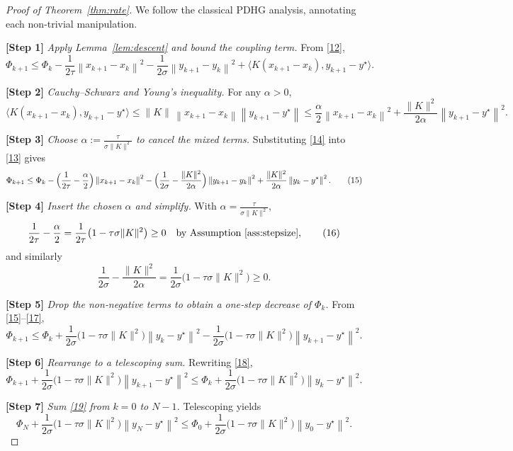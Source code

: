 \documentclass{article}
\newcommand{\ip}[2]{\langle #1,#2\rangle}
\newcommand{\norm}[1]{\left\|#1\right\|}
\begin{document}
\begin{proof}[Proof of Theorem~\ref{thm:rate}]
We follow the classical PDHG analysis, annotating each non‑trivial manipulation.

\medskip
\noindent\textbf{[Step 1]}  \textit{Apply Lemma~\ref{lem:descent} and bound the coupling term.}  
From \eqref{12},
\[
\Phi_{k+1}\le\Phi_{k}
        -\frac{1}{2\tau}\norm{x_{k+1}-x_{k}}^{2}
        -\frac{1}{2\sigma}\norm{y_{k+1}-y_{k}}^{2}
        +\ip{K(x_{k+1}-x_{k})}{y_{k+1}-y^{\star}}.
\tag{13}
\]

\noindent\textbf{[Step 2]}  \textit{Cauchy–Schwarz and Young’s inequality.}  
For any $\alpha>0$,
\[
\ip{K(x_{k+1}-x_{k})}{y_{k+1}-y^{\star}}
\le \|K\|\,\norm{x_{k+1}-x_{k}}\norm{y_{k+1}-y^{\star}}
\le \frac{\alpha}{2}\norm{x_{k+1}-x_{k}}^{2}
   +\frac{\|K\|^{2}}{2\alpha}\norm{y_{k+1}-y^{\star}}^{2}.
\tag{14}
\]

\noindent\textbf{[Step 3]}  \textit{Choose $\alpha:=\frac{\tau}{\sigma\|K\|^{2}}$ to cancel the mixed terms.}  
Substituting \eqref{14} into \eqref{13} gives
\[
\Phi_{k+1}\le\Phi_{k}
        -\Bigl(\frac{1}{2\tau}-\frac{\alpha}{2}\Bigr)\norm{x_{k+1}-x_{k}}^{2}
        -\Bigl(\frac{1}{2\sigma}-\frac{\|K\|^{2}}{2\alpha}\Bigr)\norm{y_{k+1}-y_{k}}^{2}
        +\frac{\|K\|^{2}}{2\alpha}\norm{y_{k}-y^{\star}}^{2}.
\tag{15}
\]

\noindent\textbf{[Step 4]}  \textit{Insert the chosen $\alpha$ and simplify.}  
With $\alpha=\frac{\tau}{\sigma\|K\|^{2}}$,
\[
\frac{1}{2\tau}-\frac{\alpha}{2}
   =\frac{1}{2\tau}\bigl(1-\tau\sigma\|K\|^{2}\bigr)\ge0
\quad\text{by Assumption \ref{ass:stepsize}},
\tag{16}
\]
and similarly
\[
\frac{1}{2\sigma}-\frac{\|K\|^{2}}{2\alpha}
   =\frac{1}{2\sigma}\bigl(1-\tau\sigma\|K\|^{2}\bigr)\ge0.
\tag{17}
\]

\noindent\textbf{[Step 5]}  \textit{Drop the non‑negative terms to obtain a one‑step decrease of $\Phi_{k}$.}  
From \eqref{15}–\eqref{17},
\[
\Phi_{k+1}\le\Phi_{k}
        +\frac{1}{2\sigma}\bigl(1-\tau\sigma\|K\|^{2}\bigr)
          \norm{y_{k}-y^{\star}}^{2}
        -\frac{1}{2\sigma}\bigl(1-\tau\sigma\|K\|^{2}\bigr)
          \norm{y_{k+1}-y^{\star}}^{2}.
\tag{18}
\]

\noindent\textbf{[Step 6]}  \textit{Rearrange to a telescoping sum.}  
Rewriting \eqref{18},
\[
\Phi_{k+1}+\frac{1}{2\sigma}\bigl(1-\tau\sigma\|K\|^{2}\bigr)
          \norm{y_{k+1}-y^{\star}}^{2}
\le
\Phi_{k}+\frac{1}{2\sigma}\bigl(1-\tau\sigma\|K\|^{2}\bigr)
          \norm{y_{k}-y^{\star}}^{2}.
\tag{19}
\]

\noindent\textbf{[Step 7]}  \textit{Sum \eqref{19} from $k=0$ to $N-1$.}  
Telescoping yields
\[
\Phi_{N}+\frac{1}{2\sigma}\bigl(1-\tau\sigma\|K\|^{2}\bigr)
          \norm{y_{N}-y^{\star}}^{2}
\le
\Phi_{0}+\frac{1}{2\sigma}\bigl(1-\tau\sigma\|K\|^{2}\bigr)
          \norm{y_{0}-y^{\star}}^{2}.
\tag{20}
\]


\end{proof}
\end{document}
